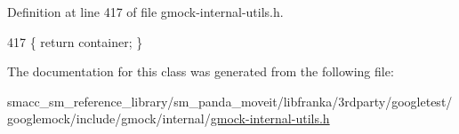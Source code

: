 Definition at line 417 of file gmock-\/internal-\/utils.\+h.


\begin{DoxyCode}
417 \{ \textcolor{keywordflow}{return} container; \}
\end{DoxyCode}


The documentation for this class was generated from the following file\+:\begin{DoxyCompactItemize}
\item 
smacc\+\_\+sm\+\_\+reference\+\_\+library/sm\+\_\+panda\+\_\+moveit/libfranka/3rdparty/googletest/googlemock/include/gmock/internal/\hyperlink{gmock-internal-utils_8h}{gmock-\/internal-\/utils.\+h}\end{DoxyCompactItemize}
